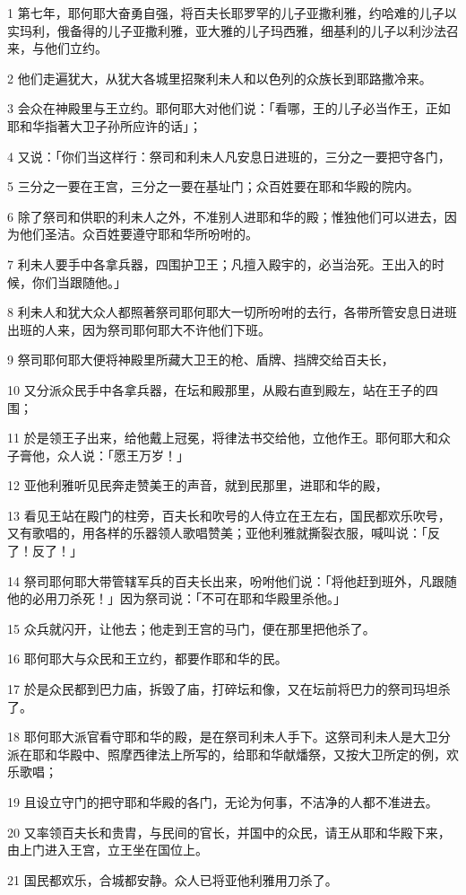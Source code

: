 \par 1 第七年，耶何耶大奋勇自强，将百夫长耶罗罕的儿子亚撒利雅，约哈难的儿子以实玛利，俄备得的儿子亚撒利雅，亚大雅的儿子玛西雅，细基利的儿子以利沙法召来，与他们立约。
\par 2 他们走遍犹大，从犹大各城里招聚利未人和以色列的众族长到耶路撒冷来。
\par 3 会众在神殿里与王立约。耶何耶大对他们说：「看哪，王的儿子必当作王，正如耶和华指著大卫子孙所应许的话」；
\par 4 又说：「你们当这样行：祭司和利未人凡安息日进班的，三分之一要把守各门，
\par 5 三分之一要在王宫，三分之一要在基址门；众百姓要在耶和华殿的院内。
\par 6 除了祭司和供职的利未人之外，不准别人进耶和华的殿；惟独他们可以进去，因为他们圣洁。众百姓要遵守耶和华所吩咐的。
\par 7 利未人要手中各拿兵器，四围护卫王；凡擅入殿宇的，必当治死。王出入的时候，你们当跟随他。」
\par 8 利未人和犹大众人都照著祭司耶何耶大一切所吩咐的去行，各带所管安息日进班出班的人来，因为祭司耶何耶大不许他们下班。
\par 9 祭司耶何耶大便将神殿里所藏大卫王的枪、盾牌、挡牌交给百夫长，
\par 10 又分派众民手中各拿兵器，在坛和殿那里，从殿右直到殿左，站在王子的四围；
\par 11 於是领王子出来，给他戴上冠冕，将律法书交给他，立他作王。耶何耶大和众子膏他，众人说：「愿王万岁！」
\par 12 亚他利雅听见民奔走赞美王的声音，就到民那里，进耶和华的殿，
\par 13 看见王站在殿门的柱旁，百夫长和吹号的人侍立在王左右，国民都欢乐吹号，又有歌唱的，用各样的乐器领人歌唱赞美；亚他利雅就撕裂衣服，喊叫说：「反了！反了！」
\par 14 祭司耶何耶大带管辖军兵的百夫长出来，吩咐他们说：「将他赶到班外，凡跟随他的必用刀杀死！」因为祭司说：「不可在耶和华殿里杀他。」
\par 15 众兵就闪开，让他去；他走到王宫的马门，便在那里把他杀了。
\par 16 耶何耶大与众民和王立约，都要作耶和华的民。
\par 17 於是众民都到巴力庙，拆毁了庙，打碎坛和像，又在坛前将巴力的祭司玛坦杀了。
\par 18 耶何耶大派官看守耶和华的殿，是在祭司利未人手下。这祭司利未人是大卫分派在耶和华殿中、照摩西律法上所写的，给耶和华献燔祭，又按大卫所定的例，欢乐歌唱；
\par 19 且设立守门的把守耶和华殿的各门，无论为何事，不洁净的人都不准进去。
\par 20 又率领百夫长和贵胄，与民间的官长，并国中的众民，请王从耶和华殿下来，由上门进入王宫，立王坐在国位上。
\par 21 国民都欢乐，合城都安静。众人已将亚他利雅用刀杀了。

